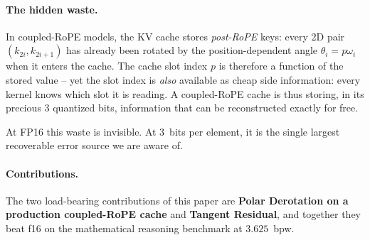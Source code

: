 \documentclass[10pt,twocolumn]{article}
\begin{document}
\paragraph{The hidden waste.}
In coupled-RoPE models, the KV cache stores \emph{post-RoPE} keys: every 2D pair $(k_{2i},k_{2i+1})$ has already been rotated by the position-dependent angle $\theta_i = p\omega_i$ when it enters the cache. The cache slot index $p$ is therefore a function of the stored value -- yet the slot index is \emph{also} available as cheap side information: every kernel knows which slot it is reading. A coupled-RoPE cache is thus storing, in its precious 3 quantized bits, information that can be reconstructed exactly for free.

At FP16 this waste is invisible. At 3~bits per element, it is the single largest recoverable error source we are aware of.

\paragraph{Contributions.}
The two load-bearing contributions of this paper are \textbf{Polar Derotation on a production coupled-RoPE cache} and \textbf{Tangent Residual}, and together they beat f16 on the mathematical reasoning benchmark at $3.625$~bpw.
\end{document}
